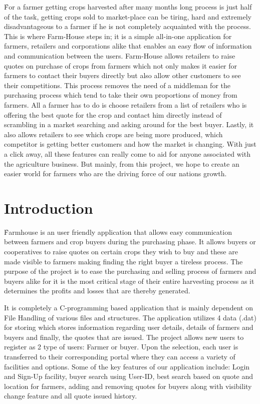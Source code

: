 \documentclass[12pt]{article}
\begin{document}
\h For a farmer getting crops harvested after many months long process is just half of the task,
getting crops sold to market-place can be tiring, hard and extremely disadvantageous to a
farmer if he is not completely acquainted with the process. This is where Farm-House steps in;
it is a simple all-in-one application for farmers, retailers and corporations alike that enables an
easy flow of information and communication between the users. Farm-House allows retailers
to raise quotes on purchase of crops from farmers which not only makes it easier for farmers
to contact their buyers directly but also allow other customers to see their competitions. This
process removes the need of a middleman for the purchasing process which tend to take their
own proportions of money from farmers. All a farmer has to do is choose retailers from a
list of retailers who is offering the best quote for the crop and contact him directly instead
of scrambling in a market searching and asking around for the best buyer. Lastly, it also
allows retailers to see which crops are being more produced, which competitor is getting better
customers and how the market is changing. With just a click away, all these features can really
come to aid for anyone associated with the agriculture business. But mainly, from this project,
we hope to create an easier world for farmers who are the driving force of our nations growth.

\newpage                %
\section{Introduction}  %

\h Farmhouse is an user friendly application that allows easy communication between farmers and crop buyers during the purchasing phase. It allows buyers or cooperatives to raise quotes on certain crops they wish to buy and these are made visible to farmers making finding the right buyer a tireless process. The purpose of the project is to ease the purchasing and selling process of farmers and buyers alike for it is the most critical stage of their entire harvesting process as it determines the profits and losses that are thereby generated.

It is completely a C-programming based application that is mainly dependent on File Handling of various files and structures. The application utilizes 4 data (.dat) for storing which stores information regarding user details, details of farmers and buyers and finally, the quotes that are issued. The project allows new users to register as 2 type of users: Farmer or buyer. Upon the selection, each user is transferred to their corresponding portal where they can access a variety of facilities and options. Some of the key features of our application include: Login and Sign-Up facility, buyer search using User-ID, best search based on quote and location for farmers, adding and removing quotes for buyers along with visibility change feature and all quote issued history. 
\end{document}
